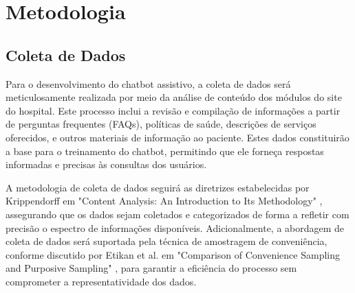\documentclass[conference]{IEEEtran}
\begin{document}









\section{Metodologia}

\subsection{Coleta de Dados}
Para o desenvolvimento do chatbot assistivo, a coleta de dados será meticulosamente realizada 
por meio da análise de conteúdo dos módulos do site do hospital. 
Este processo inclui a revisão e compilação de informações a partir de 
perguntas frequentes (FAQs), políticas de saúde, descrições de serviços oferecidos, 
e outros materiais de informação ao paciente. 
Estes dados constituirão a base para o treinamento do chatbot, 
permitindo que ele forneça respostas informadas e precisas às consultas dos usuários.

A metodologia de coleta de dados seguirá as diretrizes estabelecidas 
por Krippendorff em "Content Analysis: An Introduction to Its Methodology" \cite{Krippendorff2013}, 
assegurando que os dados sejam coletados e categorizados de forma a refletir 
com precisão o espectro de informações disponíveis. 
Adicionalmente, a abordagem de coleta de dados será suportada pela técnica de amostragem de conveniência, 
conforme discutido por Etikan et al. em "Comparison of Convenience Sampling and Purposive Sampling" \cite{Etikan2016}, 
para garantir a eficiência do processo sem comprometer a representatividade dos dados.
\end{document}
